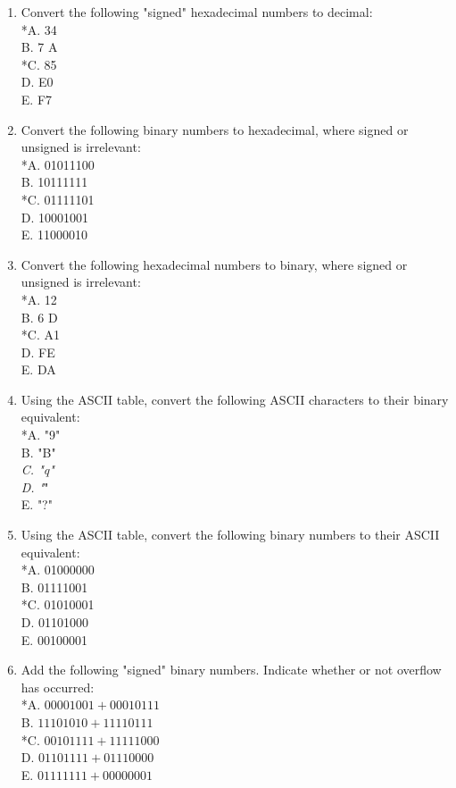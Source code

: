 \documentclass[10pt]{book}
\begin{document}
\begin{enumerate}
*A. 18\\
B. 100\\
*C. -79\\
D. -112\\
E. -247
  \item Convert the following "signed" hexadecimal numbers to decimal:\\
*A. 34\\
B. 7 A\\
*C. 85\\
D. E0\\
E. F7
  \item Convert the following binary numbers to hexadecimal, where signed or unsigned is irrelevant:\\
*A. 01011100\\
B. 10111111\\
*C. 01111101\\
D. 10001001\\
E. 11000010
  \item Convert the following hexadecimal numbers to binary, where signed or unsigned is irrelevant:\\
*A. 12\\
B. 6 D\\
*C. A1\\
D. FE\\
E. DA
  \item Using the ASCII table, convert the following ASCII characters to their binary equivalent:\\
*A. "9"\\
B. "B"\\
\textit{C. "q"\\
D. "}"\\
E. "?"
  \item Using the ASCII table, convert the following binary numbers to their ASCII equivalent:\\
*A. 01000000\\
B. 01111001\\
*C. 01010001\\
D. 01101000\\
E. 00100001
  \item Add the following "signed" binary numbers. Indicate whether or not overflow has occurred:\\
*A. $00001001+00010111$\\
B. $11101010+11110111$\\
*C. $00101111+11111000$\\
D. $01101111+01110000$\\
E. $01111111+00000001$

\end{enumerate}
\end{document}
